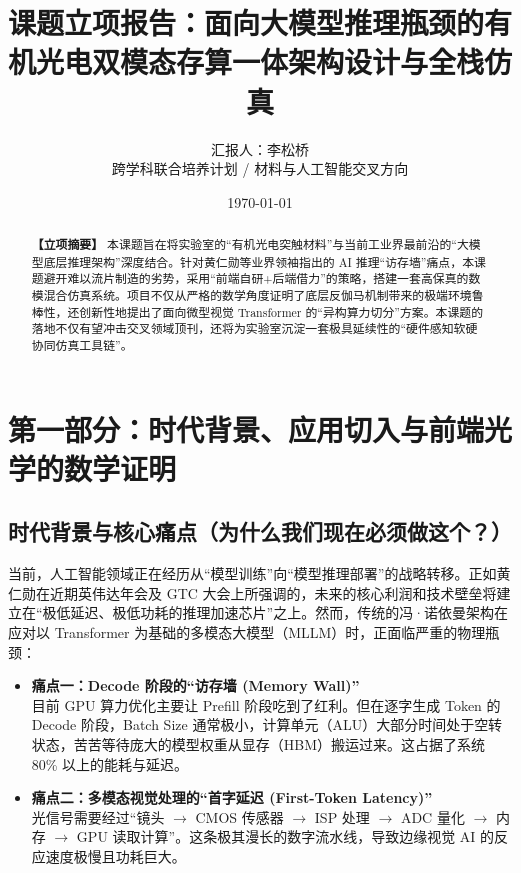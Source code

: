 \documentclass[12pt, a4paper]{ctexart}
\title{\LARGE \textbf{课题立项报告：面向大模型推理瓶颈的有机光电双模态存算一体架构设计与全栈仿真}}
\author{汇报人：李松桥 \\ \small 跨学科联合培养计划 / 材料与人工智能交叉方向}
\date{\today}
\begin{document}
\maketitle

\begin{abstract}
\noindent \textbf{【立项摘要】} 本课题旨在将实验室的“有机光电突触材料”与当前工业界最前沿的“大模型底层推理架构”深度结合。针对黄仁勋等业界领袖指出的 AI 推理“访存墙”痛点，本课题避开难以流片制造的劣势，采用“前端自研+后端借力”的策略，搭建一套高保真的数模混合仿真系统。项目不仅从严格的数学角度证明了底层反伽马机制带来的极端环境鲁棒性，还创新性地提出了面向微型视觉 Transformer 的“异构算力切分”方案。本课题的落地不仅有望冲击交叉领域顶刊，还将为实验室沉淀一套极具延续性的“硬件感知软硬协同仿真工具链”。
\end{abstract}

\vspace{1em}

\section{第一部分：时代背景、应用切入与前端光学的数学证明}

\subsection{时代背景与核心痛点（为什么我们现在必须做这个？）}
当前，人工智能领域正在经历从“模型训练”向“模型推理部署”的战略转移。正如黄仁勋在近期英伟达年会及 GTC 大会上所强调的，未来的核心利润和技术壁垒将建立在“极低延迟、极低功耗的推理加速芯片”之上。然而，传统的冯·诺依曼架构在应对以 Transformer 为基础的多模态大模型（MLLM）时，正面临严重的物理瓶颈：

\begin{itemize}
    \item \textbf{痛点一：Decode 阶段的“访存墙 (Memory Wall)”} \\
    目前 GPU 算力优化主要让 Prefill 阶段吃到了红利。但在逐字生成 Token 的 Decode 阶段，Batch Size 通常极小，计算单元（ALU）大部分时间处于空转状态，苦苦等待庞大的模型权重从显存（HBM）搬运过来。这占据了系统 80\% 以上的能耗与延迟。
    \item \textbf{痛点二：多模态视觉处理的“首字延迟 (First-Token Latency)”} \\
    光信号需要经过“镜头 $\rightarrow$ CMOS 传感器 $\rightarrow$ ISP 处理 $\rightarrow$ ADC 量化 $\rightarrow$ 内存 $\rightarrow$ GPU 读取计算”。这条极其漫长的数字流水线，导致边缘视觉 AI 的反应速度极慢且功耗巨大。
\end{itemize}
\end{document}
